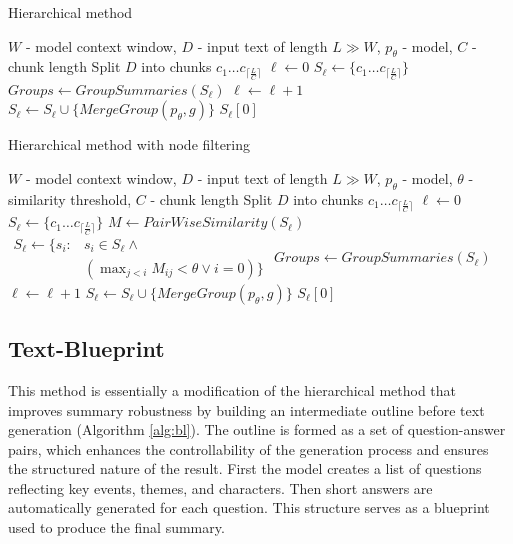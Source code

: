 \documentclass{superfri}
\begin{document}
\noindent
\begin{minipage}[t]{0.49\textwidth}
  \begin{algorithm}[H]
  \caption{Hierarchical method}\label{alg:h}
    \begin{algorithmic}
      \Require $W$ - model context window, $D$ - input text of length $L \gg W$, $p_\theta$ - model, $C$ - chunk length
      \State Split $D$ into chunks $c_1\dots c_{\lceil \frac{L}{C} \rceil}$
      \State $\ell \gets 0$
      \State $S_\ell \gets \{c_1\dots c_{\lceil \frac{L}{C} \rceil}\}$
      \Repeat
        \State $Groups \gets GroupSummaries(S_\ell)$
        \State $\ell \gets \ell + 1$
          \State $S_\ell \gets S_\ell \cup \{MergeGroup(p_\theta,g)\}$
        \EndFor
      \State \Return $S_\ell[0]$
    \end{algorithmic}
  \end{algorithm}
\end{minipage}\hfill
\begin{minipage}[t]{0.49\textwidth}
  \begin{algorithm}[H]
    \caption{Hierarchical method with node filtering}\label{alg:h_f}
    \begin{algorithmic}
      \Require $W$ - model context window, $D$ - input text of length $L \gg W$, $p_\theta$ - model, $\theta$ - similarity threshold, $C$ - chunk length
      \State Split $D$ into chunks $c_1\dots c_{\lceil \frac{L}{C} \rceil}$
      \State $\ell \gets 0$
      \State $S_\ell \gets \{c_1\dots c_{\lceil \frac{L}{C} \rceil}\}$
      \Repeat
        \State $M \gets PairWiseSimilarity(S_\ell)$
        \State $\begin{array}{ll}S_\ell \gets \{s_i: & s_i\in S_\ell \wedge\\ & (\max_{j<i}M_{ij}<\theta \vee i=0) \}\end{array}$
        \State $Groups \gets GroupSummaries(S_\ell)$
        \State $\ell \gets \ell + 1$
          \State $S_\ell \gets S_\ell \cup \{MergeGroup(p_\theta,g)\}$
        \EndFor
      \State \Return $S_\ell[0]$
    \end{algorithmic}
  \end{algorithm}
\end{minipage}

\vspace{0.4em}
\subsection{Text-Blueprint}
This method \cite{blueprint} is essentially a modification of the hierarchical method 
that improves summary robustness by building an intermediate outline before text generation  (Algorithm \ref{alg:bl}).
The outline is formed as a set of question-answer pairs, which enhances the controllability of the generation process and ensures the structured nature of the result.
First the model creates a list of questions reflecting key events, themes, and characters. Then short answers are automatically generated for each question.
This structure serves as a blueprint used to produce the final summary.
\end{document}
